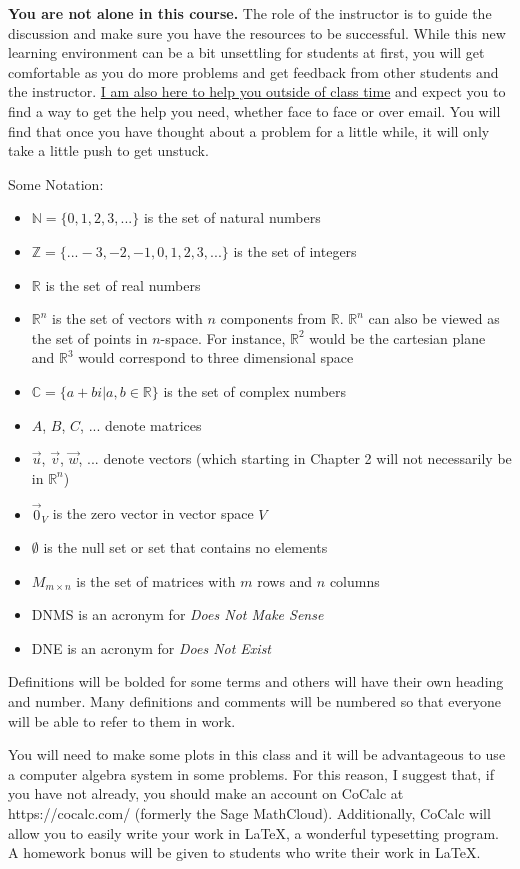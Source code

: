 \textbf{You are not alone in this course.} The role of the instructor is to guide the discussion and make sure you have the resources to be successful. While this new learning environment can be a bit unsettling for students at first, you will get comfortable as you do more problems and get feedback from other students and the instructor. \underline{I am also here to help you outside of class time} and expect you to find a way to get the help you need, whether face to face or over email. You will find that once you have thought about a problem for a little while, it will only take a little push to get unstuck.

Some Notation:
\begin{itemize}
\item $\mathbb{N}=\{0,1,2,3,...\}$ is the set of natural numbers
\item $\mathbb{Z}=\{...-3,-2,-1,0,1,2,3,...\}$ is the set of integers
\item $\mathbb{R}$ is the set of real numbers
\item $\mathbb{R}^n$ is the set of vectors with $n$ components from $\mathbb{R}$. $\mathbb{R}^n$ can also be viewed as the set of points in $n$-space. For instance, $\mathbb{R}^2$ would be the cartesian plane and $\mathbb{R}^3$ would correspond to three dimensional space
\item $\mathbb{C}=\{a+b i | a,b \in \mathbb{R}\}$ is the set of complex numbers
\item $A$, $B$, $C$, ... denote matrices
\item $\vec{u}$, $\vec{v}$, $\vec{w}$, ... denote vectors (which starting in Chapter 2 will not necessarily be in $\mathbb{R}^n$)
\item $\vec{0}_V$ is the zero vector in vector space $V$
\item $\emptyset$ is the null set or set that contains no elements
\item $M_{m \times n}$ is the set of matrices with $m$ rows and $n$ columns
\item DNMS is an acronym for \textit{Does Not Make Sense}
\item DNE is an acronym for \textit{Does Not Exist}
\end{itemize}
Definitions will be bolded for some terms and others will have their own heading and number. Many definitions and comments will be numbered so that everyone will be able to refer to them in work.

You will need to make some plots in this class and it will be advantageous to use a computer algebra system in some problems. For this reason, I suggest that, if you have not already, you should make an account on CoCalc at https://cocalc.com/ (formerly the Sage MathCloud). Additionally, CoCalc will allow you to easily write your work in LaTeX, a wonderful typesetting program. A homework bonus will be given to students who write their work in LaTeX.


